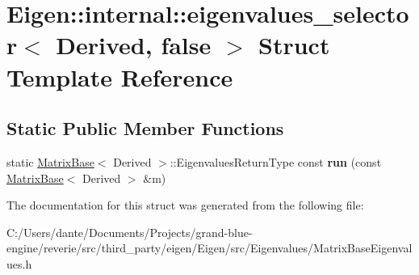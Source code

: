 \hypertarget{struct_eigen_1_1internal_1_1eigenvalues__selector_3_01_derived_00_01false_01_4}{}\section{Eigen\+::internal\+::eigenvalues\+\_\+selector$<$ Derived, false $>$ Struct Template Reference}
\label{struct_eigen_1_1internal_1_1eigenvalues__selector_3_01_derived_00_01false_01_4}
\subsection*{Static Public Member Functions}
\begin{DoxyCompactItemize}
\item 
\mbox{\label{struct_eigen_1_1internal_1_1eigenvalues__selector_3_01_derived_00_01false_01_4_ad8470d5c7d0c704771cdfdde4e495e2d}} 
static \mbox{\hyperlink{class_eigen_1_1_matrix_base}{Matrix\+Base}}$<$ Derived $>$\+::Eigenvalues\+Return\+Type const {\bfseries run} (const \mbox{\hyperlink{class_eigen_1_1_matrix_base}{Matrix\+Base}}$<$ Derived $>$ \&m)
\end{DoxyCompactItemize}


The documentation for this struct was generated from the following file\+:\begin{DoxyCompactItemize}
\item 
C\+:/\+Users/dante/\+Documents/\+Projects/grand-\/blue-\/engine/reverie/src/third\+\_\+party/eigen/\+Eigen/src/\+Eigenvalues/Matrix\+Base\+Eigenvalues.\+h\end{DoxyCompactItemize}
